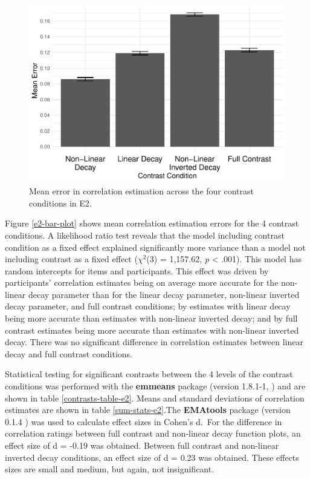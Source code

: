 \documentclass[preprint, 3p,
authoryear]{elsarticle} %
\begin{document}
\begin{figure}

\includegraphics[width=0.5\linewidth]{contrast_and_scatterplots_files/figure-latex/e2-bar-plot-1} \hfill{}

\caption{\label{e2-bar-plot}Mean error in correlation estimation across the four contrast conditions in E2.}\label{fig:e2-bar-plot}
\end{figure}

Figure \ref{e2-bar-plot} shows mean correlation estimation errors for
the 4 contrast conditions. A likelihood ratio test reveals that the
model including contrast condition as a fixed effect explained
significantly more variance than a model not including contrast as a
fixed effect (\(\chi^2\)(3) = 1,157.62, \emph{p} \textless{} .001). This
model has random intercepts for items and participants. This effect was
driven by participants' correlation estimates being on average more
accurate for the non-linear decay parameter than for the linear decay
parameter, non-linear inverted decay parameter, and full contrast
conditions; by estimates with linear decay being more accurate than
estimates with non-linear inverted decay; and by full contrast estimates
being more accurate than estimates with non-linear inverted decay. There
was no significant difference in correlation estimates between linear
decay and full contrast conditions.

Statistical testing for significant contrasts between the 4 levels of
the contrast conditions was performed with the \textbf{emmeans} package
(version 1.8.1-1, \citep{emmeans}) and are shown in table
\ref{contrasts-table-e2}. Means and standard deviations of correlation
estimates are shown in table \ref{sum-stats-e2}.The \textbf{EMAtools}
package (version 0.1.4 \citep{ematools}) was used to calculate effect
sizes in Cohen's d.~For the difference in correlation ratings between
full contrast and non-linear decay function plots, an effect size of d =
-0.19 was obtained. Between full contrast and non-linear inverted decay
conditions, an effect size of d = 0.23 was obtained. These effects sizes
are small and medium, but again, not insignificant.
\end{document}
